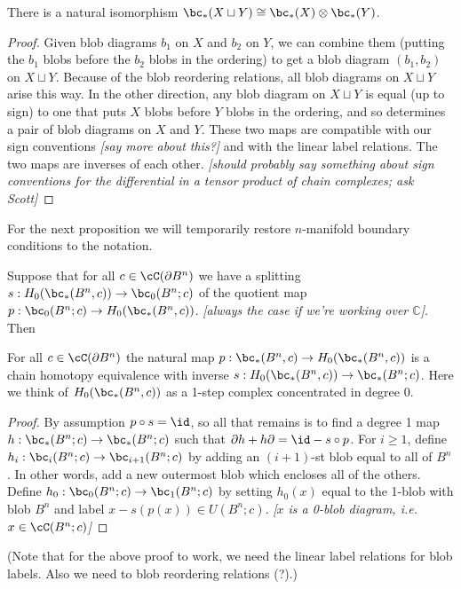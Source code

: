 \documentclass[11pt,leqno]{amsart}
\def\c{\mathbb{C}}
\def\du{\sqcup}
\def\bd{\partial}
\def\nn#1{{{\it \small [#1]}}}
\begin{document}
\begin{prop} \label{disjunion}
There is a natural isomorphism $\bc_*(X \du Y) \cong \bc_*(X) \otimes \bc_*(Y)$.
\end{prop}
\begin{proof}
Given blob diagrams $b_1$ on $X$ and $b_2$ on $Y$, we can combine them
(putting the $b_1$ blobs before the $b_2$ blobs in the ordering) to get a
blob diagram $(b_1, b_2)$ on $X \du Y$.
Because of the blob reordering relations, all blob diagrams on $X \du Y$ arise this way.
In the other direction, any blob diagram on $X\du Y$ is equal (up to sign)
to one that puts $X$ blobs before $Y$ blobs in the ordering, and so determines
a pair of blob diagrams on $X$ and $Y$.
These two maps are compatible with our sign conventions \nn{say more about this?} and
with the linear label relations.
The two maps are inverses of each other.
\nn{should probably say something about sign conventions for the differential
in a tensor product of chain complexes; ask Scott}
\end{proof}

For the next proposition we will temporarily restore $n$-manifold boundary
conditions to the notation.

Suppose that for all $c \in \cC(\bd B^n)$
we have a splitting $s: H_0(\bc_*(B^n, c)) \to \bc_0(B^n; c)$
of the quotient map
$p: \bc_0(B^n; c) \to H_0(\bc_*(B^n, c))$.
\nn{always the case if we're working over $\c$}.
Then
\begin{prop} \label{bcontract}
For all $c \in \cC(\bd B^n)$ the natural map $p: \bc_*(B^n, c) \to H_0(\bc_*(B^n, c))$
is a chain homotopy equivalence
with inverse $s: H_0(\bc_*(B^n, c)) \to \bc_*(B^n; c)$.
Here we think of $H_0(\bc_*(B^n, c))$ as a 1-step complex concentrated in degree 0.
\end{prop}
\begin{proof}
By assumption $p\circ s = \id$, so all that remains is to find a degree 1 map
$h : \bc_*(B^n; c) \to \bc_*(B^n; c)$ such that $\bd h + h\bd = \id - s \circ p$.
For $i \ge 1$, define $h_i : \bc_i(B^n; c) \to \bc_{i+1}(B^n; c)$ by adding
an $(i{+}1)$-st blob equal to all of $B^n$.
In other words, add a new outermost blob which encloses all of the others.
Define $h_0 : \bc_0(B^n; c) \to \bc_1(B^n; c)$ by setting $h_0(x)$ equal to
the 1-blob with blob $B^n$ and label $x - s(p(x)) \in U(B^n; c)$.
\nn{$x$ is a 0-blob diagram, i.e. $x \in \cC(B^n; c)$}
\end{proof}

(Note that for the above proof to work, we need the linear label relations
for blob labels.
Also we need to blob reordering relations (?).)
\end{document}
